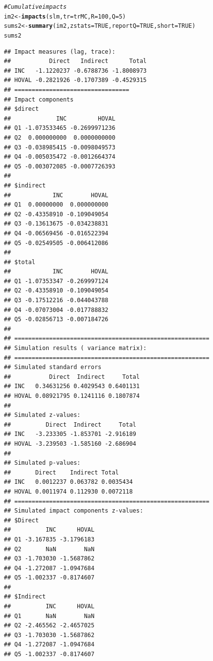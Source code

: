 \documentclass[english,12pt]{book}\usepackage[]{graphicx}\usepackage[]{xcolor}
\makeatletter
\newcommand{\hlnum}[1]{\textcolor[rgb]{0.686,0.059,0.569}{#1}}%
\newcommand{\hlcom}[1]{\textcolor[rgb]{0.678,0.584,0.686}{\textit{#1}}}%
\newcommand{\hlstd}[1]{\textcolor[rgb]{0.345,0.345,0.345}{#1}}%
\newcommand{\hlkwb}[1]{\textcolor[rgb]{0.69,0.353,0.396}{#1}}%
\newcommand{\hlkwc}[1]{\textcolor[rgb]{0.333,0.667,0.333}{#1}}%
\newcommand{\hlkwd}[1]{\textcolor[rgb]{0.737,0.353,0.396}{\textbf{#1}}}%
\newenvironment{kframe}{%
 \def\at@end@of@kframe{}%
 \ifinner\ifhmode%
  \def\at@end@of@kframe{\end{minipage}}%
  \begin{minipage}{\columnwidth}%
 \fi\fi%
 \def\FrameCommand##1{\hskip\@totalleftmargin \hskip-\fboxsep
 \colorbox{shadecolor}{##1}\hskip-\fboxsep
     \hskip-\linewidth \hskip-\@totalleftmargin \hskip\columnwidth}%
 \MakeFramed {\advance\hsize-\width
   \@totalleftmargin\z@ \linewidth\hsize
   \@setminipage}}%
 {\par\unskip\endMakeFramed%
 \at@end@of@kframe}
\newenvironment{knitrout}{}{} %
\makeatother
\begin{document}
\begin{knitrout}
\color{fgcolor}\begin{kframe}
\begin{alltt}
\hlcom{# Cumulative impacts}
\hlstd{im2}   \hlkwb{<-} \hlkwd{impacts}\hlstd{(slm,} \hlkwc{tr} \hlstd{= trMC,} \hlkwc{R} \hlstd{=} \hlnum{100}\hlstd{,} \hlkwc{Q} \hlstd{=} \hlnum{5}\hlstd{)}
\hlstd{sums2} \hlkwb{<-} \hlkwd{summary}\hlstd{(im2,} \hlkwc{zstats} \hlstd{=} \hlnum{TRUE}\hlstd{,} \hlkwc{reportQ} \hlstd{=} \hlnum{TRUE}\hlstd{,} \hlkwc{short} \hlstd{=}  \hlnum{TRUE}\hlstd{)}
\hlstd{sums2}
\end{alltt}
\begin{verbatim}
## Impact measures (lag, trace):
##           Direct   Indirect      Total
## INC   -1.1220237 -0.6788736 -1.8008973
## HOVAL -0.2821926 -0.1707389 -0.4529315
## =================================
## Impact components
## $direct
##             INC         HOVAL
## Q1 -1.073533465 -0.2699971236
## Q2  0.000000000  0.0000000000
## Q3 -0.038985415 -0.0098049573
## Q4 -0.005035472 -0.0012664374
## Q5 -0.003072085 -0.0007726393
## 
## $indirect
##            INC        HOVAL
## Q1  0.00000000  0.000000000
## Q2 -0.43358910 -0.109049054
## Q3 -0.13613675 -0.034238831
## Q4 -0.06569456 -0.016522394
## Q5 -0.02549505 -0.006412086
## 
## $total
##            INC        HOVAL
## Q1 -1.07353347 -0.269997124
## Q2 -0.43358910 -0.109049054
## Q3 -0.17512216 -0.044043788
## Q4 -0.07073004 -0.017788832
## Q5 -0.02856713 -0.007184726
## 
## ========================================================
## Simulation results ( variance matrix):
## ========================================================
## Simulated standard errors
##           Direct  Indirect     Total
## INC   0.34631256 0.4029543 0.6401131
## HOVAL 0.08921795 0.1241116 0.1807874
## 
## Simulated z-values:
##          Direct  Indirect     Total
## INC   -3.233305 -1.853701 -2.916189
## HOVAL -3.239503 -1.585160 -2.686904
## 
## Simulated p-values:
##       Direct    Indirect Total    
## INC   0.0012237 0.063782 0.0035434
## HOVAL 0.0011974 0.112930 0.0072118
## ========================================================
## Simulated impact components z-values:
## $Direct
##          INC      HOVAL
## Q1 -3.167835 -3.1796183
## Q2       NaN        NaN
## Q3 -1.703030 -1.5687862
## Q4 -1.272087 -1.0947684
## Q5 -1.002337 -0.8174607
## 
## $Indirect
##          INC      HOVAL
## Q1       NaN        NaN
## Q2 -2.465562 -2.4657025
## Q3 -1.703030 -1.5687862
## Q4 -1.272087 -1.0947684
## Q5 -1.002337 -0.8174607

\end{verbatim}
\end{kframe}
\end{knitrout}
\end{document}
